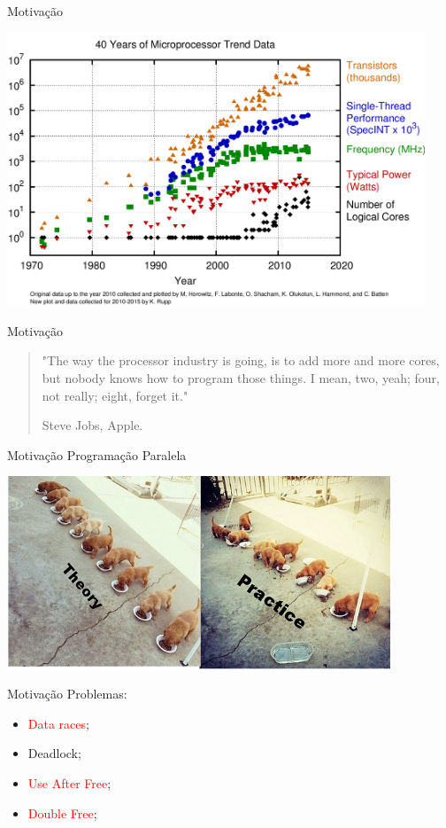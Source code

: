 \documentclass[aspectratio=169]{beamer}
\begin{document}
\begin{frame}{Motivação}
	\begin{center}
		\includegraphics[width=12.5cm]{imgs/cores-history.png}
	\end{center}
\end{frame}

\begin{frame}{Motivação}
	\begin{quote}
		"The way the processor industry is going, is to add more and more cores, but nobody knows how to program those things. I mean, two, yeah; four, not really; eight, forget it."
		
		\hspace{8.2cm}Steve Jobs, Apple.
	\end{quote}
\end{frame}

\begin{frame}{Motivação}
	Programação Paralela
	\begin{center}
		\includegraphics[width=11.5cm]{imgs/meme.png}
	\end{center}
\end{frame}

\begin{frame}{Motivação}
Problemas:
\begin{itemize}
	\item \textcolor{red}{Data races};
	\item Deadlock;
	\item \textcolor{red}{Use After Free};
	\item \textcolor{red}{Double Free};
\end{itemize}
\end{frame}
\end{document}
